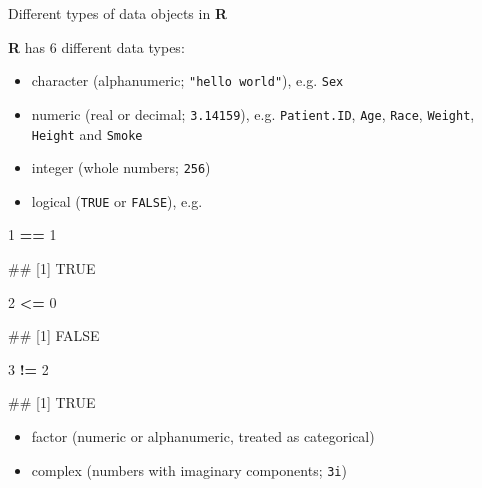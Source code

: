 \documentclass[ignorenonframetext,]{beamer}
\newenvironment{Shaded}{\begin{snugshade}}{\end{snugshade}}
\newcommand{\DecValTok}[1]{\textcolor[rgb]{0.00,0.00,0.81}{#1}}
\newcommand{\StringTok}[1]{\textcolor[rgb]{0.31,0.60,0.02}{#1}}
\newcommand{\OperatorTok}[1]{\textcolor[rgb]{0.81,0.36,0.00}{\textbf{#1}}}
\providecommand{\tightlist}{%
  \setlength{\itemsep}{0pt}\setlength{\parskip}{0pt}}
\let\oldShaded\Shaded
\let\endoldShaded\endShaded
\renewenvironment{Shaded}{\footnotesize\oldShaded}{\endoldShaded}
\let\oldverbatim\verbatim
\let\endoldverbatim\endverbatim
\renewenvironment{verbatim}{\footnotesize\oldverbatim}{\endoldverbatim}
\begin{document}
\begin{frame}[fragile]{Different types of data objects in \textbf{R}}

\textbf{R} has 6 different data types:

\begin{itemize}
\tightlist
\item
  character (alphanumeric; \texttt{"hello\ world"}), e.g. \texttt{Sex}
\item
  numeric (real or decimal; \texttt{3.14159}), e.g. \texttt{Patient.ID},
  \texttt{Age}, \texttt{Race}, \texttt{Weight}, \texttt{Height} and
  \texttt{Smoke}
\item
  integer (whole numbers; \texttt{256})
\item
  logical (\texttt{TRUE} or \texttt{FALSE}), e.g.
\end{itemize}

\begin{Shaded}
\begin{Highlighting}[]
\DecValTok{1} \OperatorTok{==}\StringTok{ }\DecValTok{1}
\end{Highlighting}
\end{Shaded}

\begin{verbatim}
## [1] TRUE
\end{verbatim}

\begin{Shaded}
\begin{Highlighting}[]
\DecValTok{2} \OperatorTok{<=}\StringTok{ }\DecValTok{0}
\end{Highlighting}
\end{Shaded}

\begin{verbatim}
## [1] FALSE
\end{verbatim}

\begin{Shaded}
\begin{Highlighting}[]
\DecValTok{3} \OperatorTok{!=}\StringTok{ }\DecValTok{2}
\end{Highlighting}
\end{Shaded}

\begin{verbatim}
## [1] TRUE
\end{verbatim}

\begin{itemize}
\tightlist
\item
  factor (numeric or alphanumeric, treated as categorical)
\item
  complex (numbers with imaginary components; \texttt{3i})
\end{itemize}

\end{frame}
\end{document}
